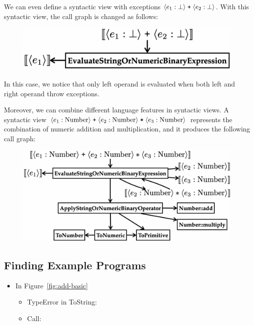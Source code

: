 We can even define a syntactic view with exceptions $\langle e_1: \bot \rangle \;
\texttt{+} \; \langle e_2: \bot \rangle$.  With this syntactic view, the call graph
is changed as follows:
\begin{figure}[H]
  \centering
  \includegraphics[width=.7\columnwidth]{img/add-exc.png}
\end{figure} \noindent
In this case, we notice that only left operand is evaluated when both left and
right operand throw exceptions.

Moreover, we can combine different language features in syntactic views.  A
syntactic view
$\langle e_1: \text{Number} \rangle \;
\texttt{+} \;
\langle e_2: \text{Number} \rangle \;
\texttt{*} \;
\langle e_3: \text{Number} \rangle$
represents the combination of numeric addition and multiplication, and it
produces the following call graph:
\begin{figure}[H]
  \centering
  \includegraphics[width=\columnwidth]{img/add-mul.png}
\end{figure}



\subsection{Finding Example Programs}\label{sec:find-prog}

\begin{itemize}
  \item In Figure~\ref{fig:add-basic}
    \begin{itemize}
      \item TypeError in ToString:
      \item Call:
    \end{itemize}
\end{itemize}
